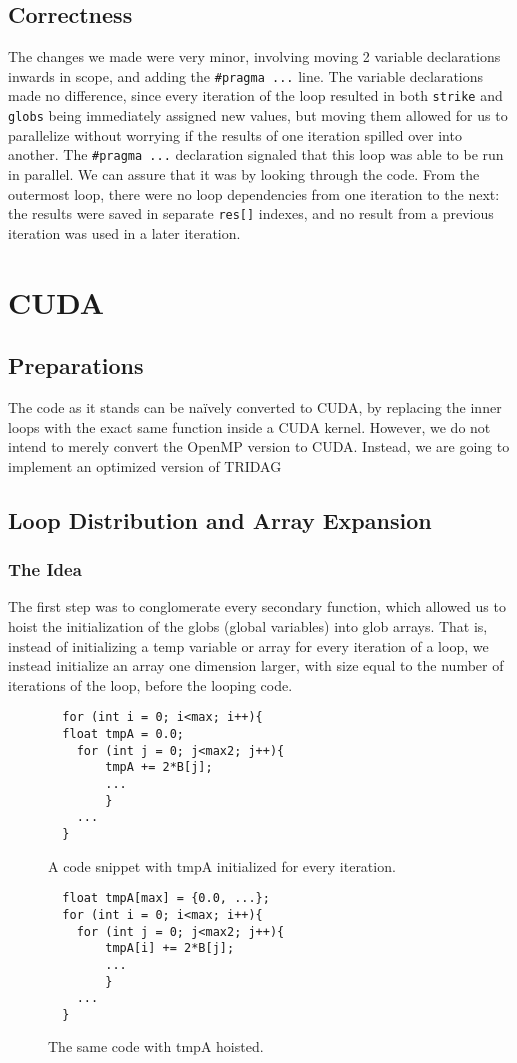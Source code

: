 \documentclass[]{report}
\begin{document}
\subsection{Correctness}
The changes we made were very minor, involving moving 2 variable declarations inwards in scope, and adding the \texttt{\#pragma ...} line. The variable declarations made no difference, since every iteration of the loop resulted in both \texttt{strike} and \texttt{globs} being immediately assigned new values, but moving them allowed for us to parallelize without worrying if the results of one iteration spilled over into another. The \texttt{\#pragma ...} declaration signaled that this loop was able to be run in parallel. We can assure that it was by looking through the code. From the outermost loop, there were no loop dependencies from one iteration to the next: the results were saved in separate \texttt{res[]} indexes, and no result from a previous iteration was used in a later iteration.
\section{CUDA}
\subsection{Preparations}
The code as it stands can be na\"ively converted to CUDA, by replacing the inner loops with the exact same function inside a CUDA kernel. However, we do not intend to merely convert the OpenMP version to CUDA. Instead, we are going to implement an optimized version of TRIDAG
\subsection{Loop Distribution and Array Expansion}
\subsubsection{The Idea}
The first step was to conglomerate every secondary function, which allowed us to hoist the initialization of the globs (global variables) into glob arrays. That is, instead of initializing a temp variable or array for every iteration of a loop, we instead initialize an array one dimension larger, with size equal to the number of iterations of the loop, before the looping code.
\begin{figure}[h]
\begin{lstlisting}
  for (int i = 0; i<max; i++){
  float tmpA = 0.0;
  	for (int j = 0; j<max2; j++){
  		tmpA += 2*B[j];
  		...
  		}
  	...
  }
 \end{lstlisting}
 \caption{ \label{fig:nohoist} A code snippet with tmpA initialized for every iteration.}
 \end{figure}
 \begin{figure}[h]
 \begin{lstlisting}
  float tmpA[max] = {0.0, ...};
  for (int i = 0; i<max; i++){
  	for (int j = 0; j<max2; j++){
  		tmpA[i] += 2*B[j];
  		...
  		}
  	...
  }
 \end{lstlisting}
 \caption{ \label{fig:yeshoist} The same code with tmpA hoisted.}
 \end{figure}
  
\end{document}
